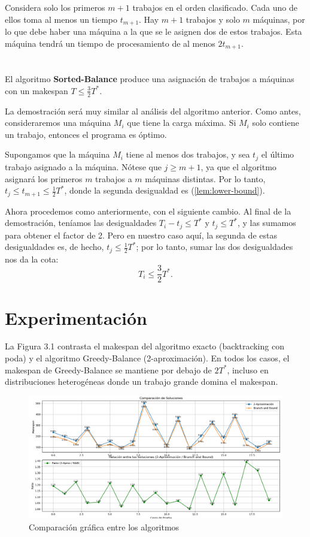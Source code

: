 \documentclass{report}
\begin{document}
		Considera solo los primeros \( m + 1 \) trabajos en el orden clasificado. Cada uno de ellos toma al menos un tiempo \( t_{m+1} \). Hay \( m + 1 \) trabajos y solo \( m \) máquinas, por lo que debe haber una máquina a la que se le asignen dos de estos trabajos. Esta máquina tendrá un tiempo de procesamiento de al menos \( 2t_{m+1} \).\\\\\\


		El algoritmo \textbf{Sorted-Balance} produce una asignación de trabajos a máquinas con un makespan \( T \leq \frac{3}{2} T^* \).

		La demostración será muy similar al análisis del algoritmo anterior. Como antes, consideraremos una máquina \( M_i \) que tiene la carga máxima. Si \( M_i \) solo contiene un trabajo, entonces el programa es óptimo.
		
		Supongamos que la máquina \( M_i \) tiene al menos dos trabajos, y sea \( t_j \) el último trabajo asignado a la máquina. Nótese que \( j \geq m + 1 \), ya que el algoritmo asignará los primeros \( m \) trabajos a \( m \) máquinas distintas. Por lo tanto, \( t_j \leq t_{m+1} \leq \frac{1}{2} T^* \), donde la segunda desigualdad es (\ref{lem:lower-bound}).
		
		Ahora procedemos como anteriormente, con el siguiente cambio. Al final de la demostración, teníamos las desigualdades \( T_i - t_j \leq T^* \) y \( t_j \leq T^* \), y las sumamos para obtener el factor de 2. Pero en nuestro caso aquí, la segunda de estas desigualdades es, de hecho, \( t_j \leq \frac{1}{2} T^* \); por lo tanto, sumar las dos desigualdades nos da la cota:
		\[
		T_i \leq \frac{3}{2} T^*.
		\]
		
	\section{Experimentación}
	
	La Figura 3.1 contrasta el makespan del algoritmo exacto (backtracking con poda) y el algoritmo Greedy-Balance (2-aproximación). En todos los casos, el makespan de Greedy-Balance se mantiene por debajo de $2T^*$, incluso en distribuciones heterogéneas donde un trabajo grande domina el makespan.
	
	\begin{figure}[H]
		\centering
		\includegraphics[width=1\linewidth]{Figure_1}
		\caption{Comparación gráfica entre los algoritmos}
		\label{fig:figure1}
	\end{figure}
	
\end{document}
